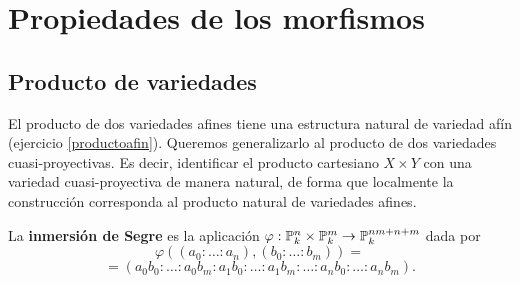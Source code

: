 \documentclass[ACGA.tex]{subfiles}
\begin{document}
%
%
%
%
%
%
%
%
%
%
%
%

\chapter{Propiedades de los morfismos}

\section{Producto de variedades}

El producto de dos variedades afines tiene una estructura natural de variedad afín (ejercicio \ref{productoafin}). Queremos generalizarlo al producto de dos variedades cuasi-proyectivas. Es decir, identificar el producto cartesiano $X\times Y$ con una variedad cuasi-proyectiva de manera natural, de forma que localmente la construcción corresponda al producto natural de variedades afines.

\begin{defi} La {\bf inmersión de Segre} es la aplicación $\varphi:\mathbb{P}^n_k\times\mathbb{P}^m_k\to\mathbb{P}^{nm+n+m}_k$ dada por
 $$
\varphi((a_0:\ldots:a_n),(b_0:\ldots:b_m))=
$$
$$
=(a_0b_0:\ldots:a_0b_m:a_1b_0:\ldots:a_1b_m:\ldots:a_nb_0:\ldots:a_nb_m).
$$
\end{defi}
\end{document}
